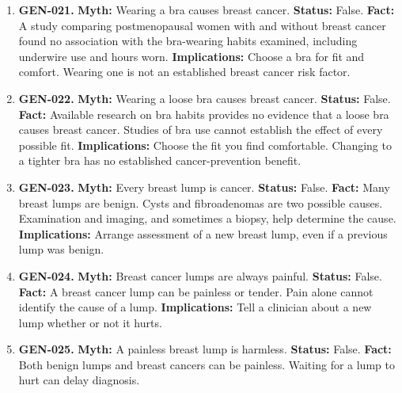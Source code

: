 \documentclass[11pt,oneside]{book}
\begin{document}
\begin{enumerate}[leftmargin=0pt,labelwidth=0pt,labelsep=0pt,itemindent=0pt]
\item[] \textbf{GEN-021.} \textbf{Myth:} Wearing a bra causes breast cancer.\newline
\textbf{Status:} False.\newline
\textbf{Fact:} A study comparing postmenopausal women with and without breast cancer found no association with the bra-wearing habits examined, including underwire use and hours worn. \cite{ref244}\newline
\textbf{Implications:} Choose a bra for fit and comfort. Wearing one is not an established breast cancer risk factor.
\item[] \textbf{GEN-022.} \textbf{Myth:} Wearing a loose bra causes breast cancer.\newline
\textbf{Status:} False.\newline
\textbf{Fact:} Available research on bra habits provides no evidence that a loose bra causes breast cancer. Studies of bra use cannot establish the effect of every possible fit. \cite{ref244}\newline
\textbf{Implications:} Choose the fit you find comfortable. Changing to a tighter bra has no established cancer-prevention benefit.
\item[] \textbf{GEN-023.} \textbf{Myth:} Every breast lump is cancer.\newline
\textbf{Status:} False.\newline
\textbf{Fact:} Many breast lumps are benign. Cysts and fibroadenomas are two possible causes. Examination and imaging, and sometimes a biopsy, help determine the cause. \cite{ref311}\newline
\textbf{Implications:} Arrange assessment of a new breast lump, even if a previous lump was benign.
\item[] \textbf{GEN-024.} \textbf{Myth:} Breast cancer lumps are always painful.\newline
\textbf{Status:} False.\newline
\textbf{Fact:} A breast cancer lump can be painless or tender. Pain alone cannot identify the cause of a lump. \cite{ref311}\newline
\textbf{Implications:} Tell a clinician about a new lump whether or not it hurts.
\item[] \textbf{GEN-025.} \textbf{Myth:} A painless breast lump is harmless.\newline
\textbf{Status:} False.\newline
\textbf{Fact:} Both benign lumps and breast cancers can be painless. Waiting for a lump to hurt can delay diagnosis. \cite{ref311}\newline

\end{enumerate}
\end{document}
